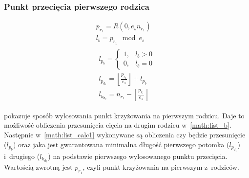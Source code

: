 \subsubsection{Punkt przecięcia pierwszego rodzica}
\label{subsubsec:list_cp1}
\vspace{-\parskip}
\begin{fleqn}
  \begin{gather}
    \label{math:list_cp1_rand}
    p_{r_1}=R\left(0, e_s n_{r_1}\right)\\
    \label{math:list_b}
    l_b=p_{r_1} \mod e_s\\
    \label{math:list_calc1}
    \begin{gathered}
      l_{p_b}=\begin{cases}
        1 ,& l_b>0\\
        0 ,& l_b=0
      \end{cases}\\
      l_{p_{d_1}}=\left\lfloor
        \frac{p_{r_1}}{e_s}
      \right\rfloor + l_{p_b}\\
      l_{k_{d_2}}=n_{r_1}-\left\lfloor
        \frac{p_{r_1}}{e_s}
      \right\rfloor
    \end{gathered}
  \end{gather}
\end{fleqn}
 pokazuje sposób
wylosowania punkt krzyżowania na pierwszym rodzicu.
Daje to możliwość obliczenia przesunięcia cięcia
na drugim rodzicu w~\cref{math:list_b}.
Następnie w~\cref{math:list_calc1} wykonywane
są obliczenia czy będzie przesunięcie ($l_{p_b}$)
oraz jaka jest gwarantowana minimalna długość pierwszego
potomka ($l_{p_{d_1}}$) i~drugiego ($l_{k_{d_2}}$)
na podstawie pierwszego wylosowanego punktu przecięcia.
Wartością zwrotną jest $p_{r_1}$, czyli punkt
krzyżowania na pierwszym z~rodziców.

